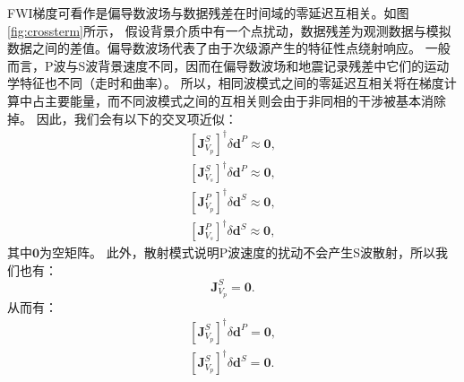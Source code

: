 FWI梯度可看作是偏导数波场与数据残差在时间域的零延迟互相关\cite[]{pratt1998gauss}。如图\ref{fig:crossterm}所示，
假设背景介质中有一个点扰动，数据残差为观测数据与模拟数据之间的差值。偏导数波场代表了由于次级源产生的特征性点绕射响应。
一般而言，P波与S波背景速度不同，因而在偏导数波场和地震记录残差中它们的运动学特征也不同（走时和曲率）。
所以，相同波模式之间的零延迟互相关将在梯度计算中占主要能量，而不同波模式之间的互相关则会由于非同相的干涉被基本消除掉。
因此，我们会有以下的交叉项近似：
\begin{equation}
        \begin{split}
                [\mathbf{J}_{V_p}^{S}]^{\dagger}\delta \mathbf{d}^P\approx\mathbf{0},\\
                [\mathbf{J}_{V_s}^{S}]^{\dagger}\delta \mathbf{d}^P\approx\mathbf{0},\\
                [\mathbf{J}_{V_p}^{P}]^{\dagger}\delta \mathbf{d}^S\approx\mathbf{0},\\
                [\mathbf{J}_{V_s}^{P}]^{\dagger}\delta \mathbf{d}^S\approx\mathbf{0},
        \end{split}
        \label{eq:crossterms}
\end{equation}
其中$\mathbf{0}$为空矩阵。
此外，散射模式说明P波速度的扰动不会产生S波散射，所以我们也有：
\begin{equation}
\mathbf{J}^S_{V_p}=\mathbf{0}.
\label{eq:Jsvp}
\end{equation}
从而有：
\begin{equation}
        \begin{split}
[\mathbf{J}^S_{V_p}]^{\dagger}\delta \mathbf{d}^P=\mathbf{0}, \\
[\mathbf{J}^S_{V_p}]^{\dagger}\delta \mathbf{d}^S=\mathbf{0}.
        \end{split}
\label{eq:Jsvp1}
\end{equation}
